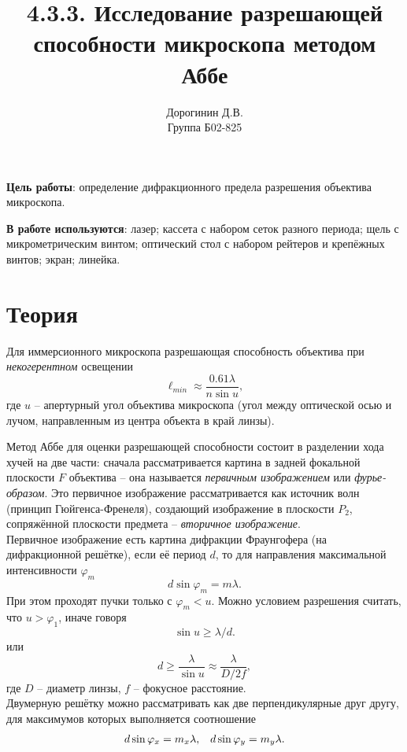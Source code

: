 \documentclass[a4paper,12pt]{article}
\author{Дорогинин Д.В.\\
Группа Б02-825}
\title{4.3.3. Исследование разрешающей способности микроскопа методом Аббе}
\date{}
\begin{document}
\maketitle
\textbf{Цель работы}: определение дифракционного предела разрешения объектива микроскопа.


\textbf{В работе используются}: лазер; кассета с набором сеток разного периода; щель с микрометрическим винтом; оптический стол с набором рейтеров и крепёжных винтов; экран; линейка.
\section*{Теория}
Для иммерсионного микроскопа разрешающая способность объектива при \textit{некогерентном} освещении
\begin{equation}
\ell_{min} \approx \dfrac{0.61\lambda}{n \sin u},
\end{equation}
где $u$ -- апертурный угол объектива микроскопа (угол между оптической осью и лучом, направленным из центра объекта в край линзы).

Метод Аббе для оценки разрешающей способности состоит в разделении хода хучей на две части: сначала рассматривается картина в задней фокальной плоскости $F$ объектива -- она называется \textit{первичным изображением} или \textit{фурье-образом}. Это первичное изображение рассматривается как источник волн (принцип Гюйгенса-Френеля), создающий изображение в плоскости $P_2$, сопряжённой плоскости предмета -- \textit{вторичное изображение}.\\
Первичное изображение есть картина дифракции Фраунгофера (на дифракционной решётке), если её период $d$, то для направления максимальной интенсивности $\varphi_m$
\begin{equation}
d \sin \varphi_m = m\lambda.
\end{equation}
При этом проходят пучки только с $\varphi_m < u$. Можно условием разрешения считать, что $u > \varphi_1$, иначе говоря
$$
\sin u \geq \lambda/d.
$$
или
\begin{equation}
d \geq \dfrac{\lambda}{\sin u} \approx \dfrac{\lambda}{D/2f},
\end{equation}
где $D$ -- диаметр линзы, $f$ -- фокусное расстояние.\\
Двумерную решётку можно рассматривать как две перпендикулярные друг другу, для максимумов которых выполняется соотношение
\begin{equation}
\begin{array}{c c}
d\sin \varphi_x = m_x \lambda, & d\sin \varphi_y = m_y \lambda. \\
\end{array}
\end{equation}
\newpage
\end{document}
